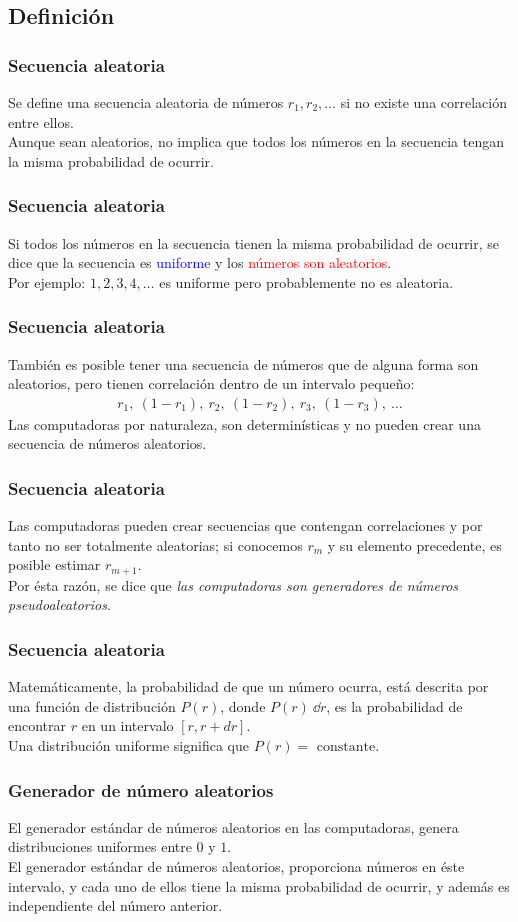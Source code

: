 \subsection{Definición}
\begin{frame}
\frametitle{Secuencia aleatoria}
Se define una secuencia aleatoria de números $r_{1}, r_{2}, \ldots$ si no existe una correlación entre ellos.
\\
\bigskip
Aunque sean aleatorios, no implica que todos los números en la secuencia tengan la misma probabilidad de ocurrir.
\end{frame}
\begin{frame}
\frametitle{Secuencia aleatoria}
Si todos los números en la secuencia tienen la misma probabilidad de ocurrir, se dice que la secuencia es \textcolor{blue}{uniforme} y los \textcolor{red}{números son aleatorios}.
\\
\bigskip
Por ejemplo: $1, 2, 3, 4, \ldots$ es uniforme pero probablemente no es aleatoria.
\end{frame}
\begin{frame}
\frametitle{Secuencia aleatoria}
También es posible tener una secuencia de números que de alguna forma son aleatorios, pero tienen correlación dentro de un intervalo pequeño:
\begin{align*}
r_{1}, \: (1 - r_{1}), \: r_{2}, \: (1 - r_{2}), \: r_{3}, \: (1 - r_{3}), \: \ldots
\end{align*}
Las computadoras por naturaleza, son determinísticas y no pueden crear una secuencia de números aleatorios.
\end{frame}
\begin{frame}
\frametitle{Secuencia aleatoria}
Las computadoras pueden crear secuencias que contengan correlaciones y por tanto no ser totalmente aleatorias; si conocemos $r_{m}$ y su elemento precedente, es posible estimar $r_{m+1}$.
\\
\bigskip
\pause
Por ésta razón, se dice que \emph{las computadoras son generadores de números pseudoaleatorios}.
\end{frame}
\begin{frame}
\frametitle{Secuencia aleatoria}
Matemáticamente, la probabilidad de que un número ocurra, está descrita por una función de distribución $P(r)$, donde $P(r) \: \dd{r}$, es la probabilidad de encontrar $r$ en un intervalo $[r, r + dr]$.
\\
\bigskip
Una distribución uniforme significa que $P(r) = \text{ constante}$.
\end{frame}
\begin{frame}
\frametitle{Generador de número aleatorios}
El generador estándar de números aleatorios en las computadoras, genera distribuciones uniformes entre $0$ y $1$.
\\
\bigskip
El generador estándar de números aleatorios, proporciona números en éste intervalo, y cada uno de ellos tiene la misma probabilidad de ocurrir, y además es independiente del número anterior.
\end{frame}
